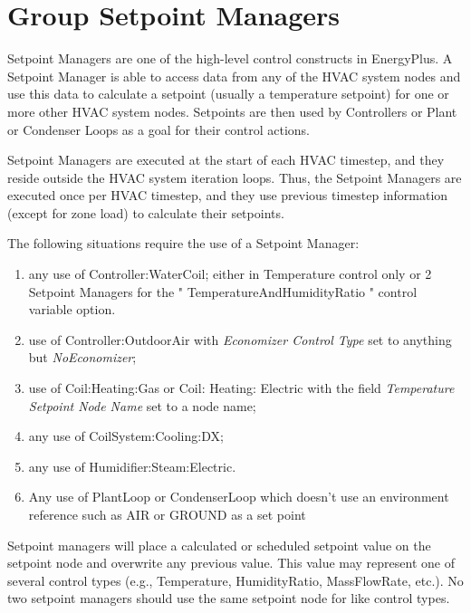 \section{Group Setpoint Managers}\label{group-setpoint-managers}

Setpoint Managers are one of the high-level control constructs in EnergyPlus. A Setpoint Manager is able to access data from any of the HVAC system nodes and use this data to calculate a setpoint (usually a temperature setpoint) for one or more other HVAC system nodes. Setpoints are then used by Controllers or Plant or Condenser Loops as a goal for their control actions.

Setpoint Managers are executed at the start of each HVAC timestep, and they reside outside the HVAC system iteration loops. Thus, the Setpoint Managers are executed once per HVAC timestep, and they use previous timestep information (except for zone load) to calculate their setpoints.

The following situations require the use of a Setpoint Manager:

\begin{enumerate}
\def\labelenumi{\arabic{enumi})}
\item
  any use of Controller:WaterCoil; either in Temperature control only or 2 Setpoint Managers for the " TemperatureAndHumidityRatio " control variable option.
\item
  use of Controller:OutdoorAir with \emph{Economizer Control Type} set to anything but \emph{NoEconomizer};
\item
  use of Coil:Heating:Gas or Coil: Heating: Electric with the field \emph{Temperature Setpoint Node Name} set to a node name;
\item
  any use of CoilSystem:Cooling:DX;
\item
  any use of Humidifier:Steam:Electric.
\item
  Any use of PlantLoop or CondenserLoop which doesn't use an environment reference such as AIR or GROUND as a set point
\end{enumerate}

Setpoint managers will place a calculated or scheduled setpoint value on the setpoint node and overwrite any previous value. This value may represent one of several control types (e.g., Temperature, HumidityRatio, MassFlowRate, etc.). No two setpoint managers should use the same setpoint node for like control types.

